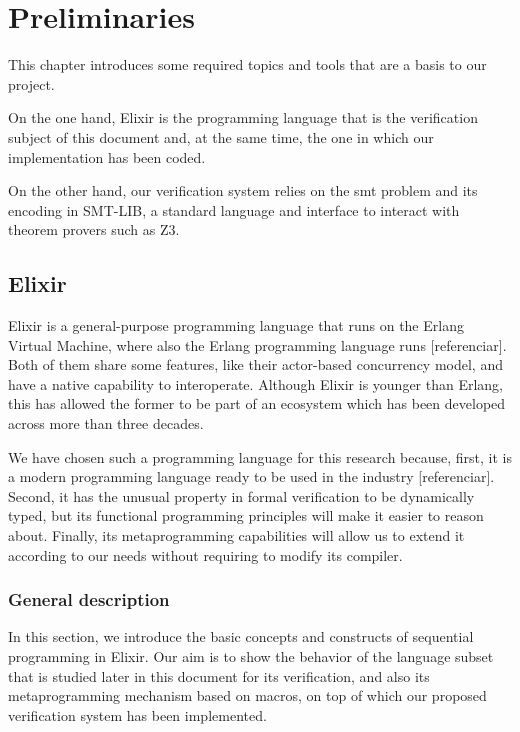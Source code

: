 \chapter{Preliminaries}
\label{cap:preliminaries}

This chapter introduces some required topics and tools that are a basis to
our project.

On the one hand, Elixir is the programming language that is the verification
subject of this document and, at the same time, the one in which our
implementation has been coded.

On the other hand, our verification system relies on the \gls{smt} problem and
its encoding in SMT-LIB, a standard language and interface to interact with
theorem provers such as Z3.

\section{Elixir}

Elixir is a general-purpose programming language that runs on the Erlang
Virtual Machine, where also the Erlang programming language runs [referenciar].
Both of them share some features, like their actor-based concurrency model,
and have a native capability to interoperate. Although Elixir is younger than
Erlang, this has allowed the former to be part of an ecosystem which has been
developed across more than three decades.

We have chosen such a programming language for this research because,
first, it is a modern programming language ready to be used in the
industry [referenciar]. Second, it has the unusual property in formal 
verification to be dynamically typed, but its functional programming principles
will make it easier to reason about. Finally, its metaprogramming capabilities
will allow us to extend it according to our needs without requiring to modify
its compiler.

\subsection{General description}

In this section, we introduce the basic concepts and constructs of sequential
programming in Elixir. Our aim is to show the behavior of the language subset
that is studied later in this document for its verification, and also
its metaprogramming mechanism based on macros, on top of which our proposed
verification system has been implemented.

